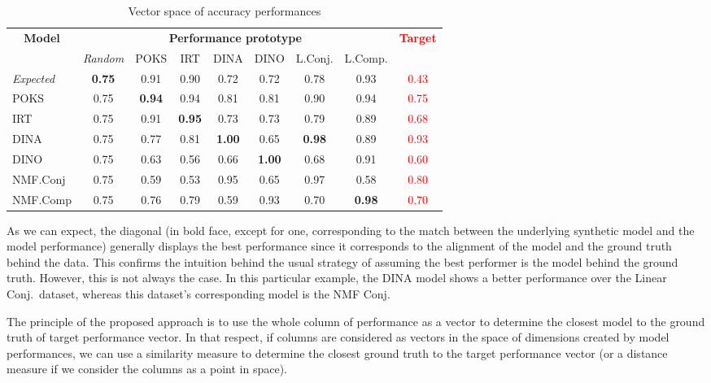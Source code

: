\begin{table}[ht]
\caption{Vector space of accuracy performances}\label{tab:vectorspace}
\centering
\begin{tabular}{lcccccccc}
\cline{1-9}
  \multicolumn{1}{c}{\multirow{2}{*}{\textbf{Model}}} & \multicolumn{7}{c}{\textbf{Performance prototype }} & \multicolumn{1}{c}{\multirow{2}{*}{\textbf{\textcolor{red}{Target}}}}\\
  \cline{2-8}
  & \multicolumn{1}{c}{{\textit{Random}}} & \multicolumn{1}{c}{{POKS}} & \multicolumn{1}{c}{{IRT}} & \multicolumn{1}{c}{{DINA}} & \multicolumn{1}{c}{{DINO}} & \multicolumn{1}{c}{{L.Conj.}} & \multicolumn{1}{c}{{L.Comp.}} &\\ 
\cline{1-9}
  \textit{Expected} & \textbf{0.75} & 0.91 & 0.90 & 0.72 & 0.72 & 0.78 & 0.93 & \textcolor{red}{0.43} \\ 
  POKS & 0.75 & \textbf{0.94} & 0.94 & 0.81 & 0.81 & 0.90 & 0.94  & \textcolor{red}{0.75}\\ 
  IRT & 0.75 & 0.91 & \textbf{0.95} & 0.73 & 0.73 & 0.79 & 0.89  & \textcolor{red}{0.68}\\ 
  DINA & 0.75 & 0.77 & 0.81 & \textbf{1.00} & 0.65 & \textbf{0.98} & 0.89  & \textcolor{red}{0.93}\\ 
  DINO & 0.75 & 0.63 & 0.56 & 0.66 & \textbf{1.00} & 0.68 & 0.91  & \textcolor{red}{0.60}\\ 
  NMF.Conj & 0.75& 0.59 & 0.53 & 0.95 & 0.65 & 0.97 & 0.58  & \textcolor{red}{0.80}\\ 
  NMF.Comp & 0.75 & 0.76 & 0.79 & 0.59 & 0.93 & 0.70 & \textbf{0.98}  & \textcolor{red}{0.70}\\ 
\cline{1-9}
\end{tabular}
\end{table}



As we can expect, the diagonal (in bold face, except for one, corresponding to the match between the underlying synthetic model and the model performance) generally displays the best performance since it corresponds to the alignment of the model and the ground truth behind the data. This confirms the intuition behind the usual strategy of assuming the best performer is the model behind the ground truth. However, this is not always the case. In this particular example, the DINA model shows a better performance over the Linear Conj.\ dataset, whereas this dataset's corresponding model is the NMF Conj. 

The principle of the proposed approach is to use the whole column of performance as a vector to determine the closest model to the ground truth of target performance vector. In that respect, if columns are considered as vectors in the space of dimensions created by model performances, we can use a similarity measure to determine the closest ground truth to the target performance vector (or a distance measure if we consider the columns as a point in space).


